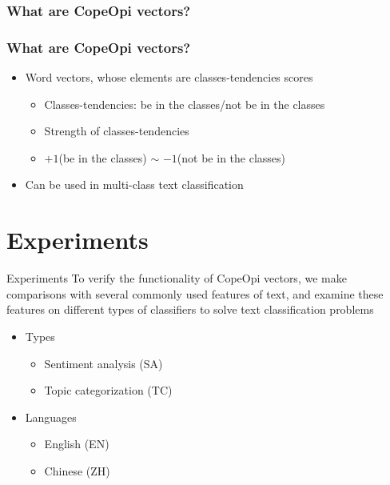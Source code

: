 \documentclass[mathserif]{beamer}
\begin{document}
\subsubsection{What are CopeOpi vectors?}
\begin{frame}
\frametitle{What are CopeOpi vectors?}
\begin{itemize}
\item Word vectors, whose elements are classes-tendencies scores
	\begin{itemize}
	\item Classes-tendencies: be in the classes/not be in the classes
	\item Strength of classes-tendencies
	\item $+1$(be in the classes) $\sim$ $-1$(not be in the classes)
	\end{itemize}
\item Can be used in multi-class text classification
\end{itemize}
\end{frame}


\section{Experiments}
\begin{frame}{Experiments}
To verify the functionality of CopeOpi vectors, we make comparisons with several commonly used features of text, and examine these features on different types of classifiers to solve text classification problems
\begin{itemize}
\item Types
	\begin{itemize}
	\item Sentiment analysis (SA)
	\item Topic categorization (TC)
	\end{itemize}
\item Languages
	\begin{itemize}
	\item English (EN)
	\item Chinese (ZH)
	\end{itemize}
\end{itemize}
\end{frame}
\end{document}
